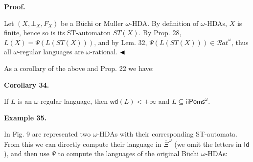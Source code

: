 \documentclass[10pt,a4paper]{article}
\begin{document}
 
 
 
\par\medskip\noindent\textbf{Proof.}\par
 
 
Let $(X,\bot_{X},F_{X})$ be a Büchi or Muller $\omega$-HDA. By definition of $\omega$-HDAs, $X$ is finite, hence so is its ST-automaton $ST(X)$. By Prop. 28, $L(X)=\Psi(L(ST(X)))$, and by Lem. 32, $\Psi(L(ST(X)))\in{\mathcal{R}at}^{\omega}$, thus all $\omega$-regular languages are $\omega$-rational. $\hfill\blacktriangleleft$\par
 
 
 
As a corollary of the above and Prop. 22 we have:\par
 
 
 
\par\medskip\noindent\textbf{Corollary 34.}\par
 
 
If $L$ is an $\omega$-regular language, then $\mathsf{wd}(L)<+\infty$ and $L\subseteq{\mathsf{iiPoms}^{\omega}}$.\par
 
 
 
 
\par\medskip\noindent\textbf{Example 35.}\par
 
 
In Fig. 9 are represented two $\omega$-HDAs with their corresponding ST-automata. From this we can directly compute their language in $\overline{\Xi}^{\omega}$ (we omit the letters in $\mathsf{Id}$), and then use $\Psi$ to compute the languages of the original Büchi $\omega$-HDAs:\par
 
 
 
\end{document}
